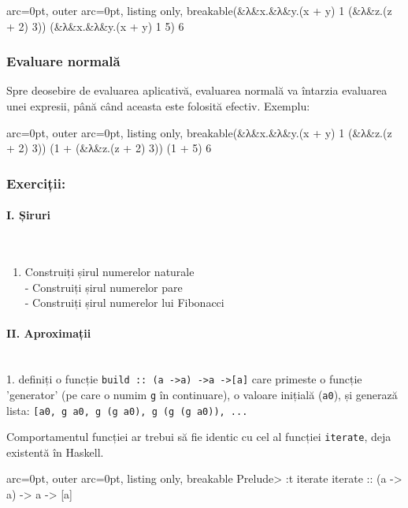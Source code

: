 \begin{tcblisting}{ arc=0pt, outer arc=0pt, listing only, breakable}(&λ&x.&λ&y.(x + y) 1 (&λ&z.(z + 2) 3))
(&λ&x.&λ&y.(x + y) 1 5)
6
\end{tcblisting}



\subsubsection*{Evaluare normală}

Spre deosebire de evaluarea aplicativă, evaluarea normală va întarzia evaluarea unei expresii, până când aceasta este folosită efectiv. Exemplu:


\begin{tcblisting}{ arc=0pt, outer arc=0pt, listing only, breakable}(&λ&x.&λ&y.(x + y) 1 (&λ&z.(z + 2) 3))
(1 + (&λ&z.(z + 2) 3))
(1 + 5)
6
\end{tcblisting}



\subsubsection*{Exerciții:}


\paragraph{ I. Șiruri }\hfill\\

\begin{enumerate}
	\item  Construiți șirul numerelor naturale\\  - Construiți șirul numerelor pare\\  - Construiți șirul numerelor lui Fibonacci 
\end{enumerate}

\paragraph{ II. Aproximații }\hfill\\

1. definiți o funcție \texttt{build :: (a -\textgreater  a) -\textgreater  a -\textgreater  [a]} care primeste o funcție 'generator' (pe care o numim \texttt{g} în continuare), o valoare inițială (\texttt{a0}), și generază lista: \texttt{[a0, g a0, g (g a0), g (g (g a0)), ... }
  
\begin{tcolorbox}[colback=cyan!5, colframe=cyan!10, breakable]
Comportamentul funcției ar trebui să fie identic cu cel al funcției \texttt{iterate}, deja existentă în Haskell.


\begin{tcblisting}{ arc=0pt, outer arc=0pt, listing only, breakable}
Prelude> :t iterate
iterate :: (a -> a) -> a -> [a]

\end{tcblisting}

\end{tcolorbox}

